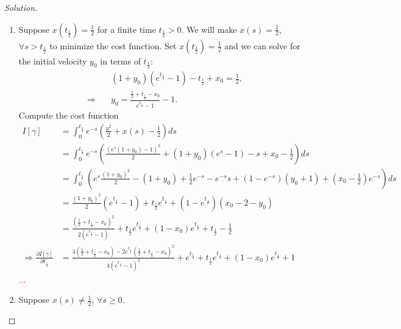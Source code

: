 \documentclass[english,reqno]{amsart}
\newenvironment{solution}
  {\renewcommand\qedsymbol{$\blacksquare$}\begin{proof}[Solution]}
  {\end{proof}}
\begin{document}
\begin{enumerate}[label=\arabic*)]
\begin{solution}
\begin{itemize}
\begin{enumerate}
        \begin{enumerate}
    \item Suppose $\displaystyle x\left(t_\frac{1}{2}\right)=\frac{1}{2}$ for a finite time $t_{\frac{1}{2}} >0$. We will make $x(s)=\frac{1}{2}$, $\forall s>t_\frac{1}{2}$ to minimize the cost function. 
    Set $\displaystyle x \left(t_{\frac{1}{2}} \right)=\frac{1}{2}$ and we can solve for the initial velocity $y_0$ in terms of $t_\frac{1}{2}$:
    \begin{equation*}
        \begin{aligned}
         &(1+y_0)(e^{t_{\frac{1}{2}}}-1)-t_{\frac{1}{2}}+x_0 =\frac{1}{2},\\
         	\Longrightarrow \quad & y_0= \frac{\frac{1}{2} + t_\frac{1}{2} - x_0}{e^{t_\frac{1}{2}}-1}-1.
        \end{aligned}
    \end{equation*}
    Compute the cost function
    \begin{equation*}
    \begin{aligned}
     I[\gamma]&= \int_0^{t_\frac{1}{2}} e^{-s}\left(\frac{y^2}{2} + x(s)-\frac{1}{2}\right)ds\\
     &= \int_0^{t_\frac{1}{2}} e^{-s}\left(\frac{(e^s(1+y_0)-1)^2}{2} + (1+y_0)(e^s-1)-s+x_0-\frac{1}{2}\right)ds\\
     &=\int_0^{t_\frac{1}{2}}\left( e^s \frac{(1+y_0)^2}{2}  -(1+y_0) +\frac{1}{2} e^{-s} -e^{-s}s +(1-e^{-s})(y_0+1) + \left(x_0-\frac{1}{2}\right)e^{-s}\right)ds\\
     &=\frac{(1+y_0)^2}{2}\left(e^{t_{\frac{1}{2}}}-1\right)+t_{\frac{1}{2}}e^{t_{\frac{1}{2}}}+\left(1-e^{t_{\frac{1}{2}}}\right)(x_0-2-y_0)\\
     &= \frac{\left(\frac{1}{2}+t_\frac{1}{2}-x_0\right)^2}{2 \left(e^{t_\frac{1}{2}}-1\right)}+t_{\frac{1}{2}}e^{t_\frac{1}{2}}+(1-x_0)e^{t_\frac{1}{2}}+t_\frac{1}{2}-\frac{1}{2}\\
     \Longrightarrow \frac{\partial I[\gamma]}{\partial t_\frac{1}{2}} &=\frac{4\left( \frac{1}{2} + t_\frac{1}{2} -x_0\right)-2e^{t_\frac{1}{2}}\left(\frac{1}{2}+t_\frac{1}{2}-x_0 \right)^2}{4\left(e^{t_\frac{1}{2}}-1\right)^2}+e^{t_\frac{1}{2}}+t_{\frac{1}{2}}e^{t_\frac{1}{2}}+(1-x_0)e^{t_\frac{1}{2}}+1
    \end{aligned}
    \end{equation*}
    \textcolor{red}{...}
    
    \item Suppose $\displaystyle x(s)\neq \frac{1}{2}$, $\forall s \geq 0$.
    \end{enumerate}
    \end{enumerate}




\end{itemize}
\end{solution}
\end{enumerate}
\end{document}
